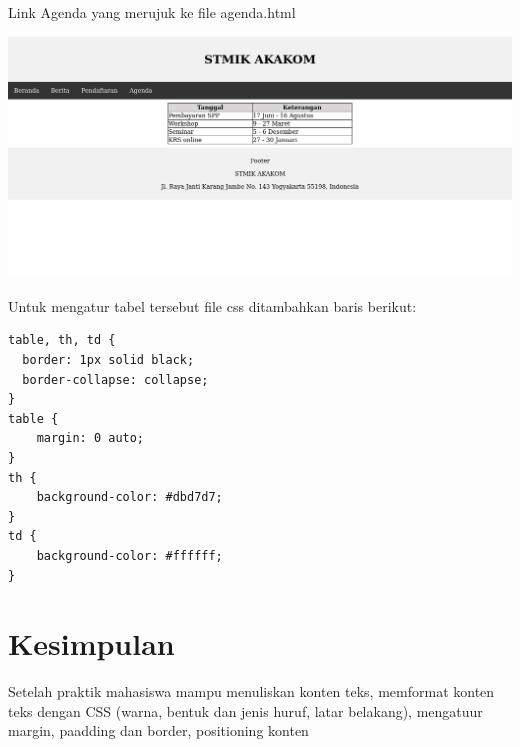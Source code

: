 \documentclass[a4paper,12pt]{article}
\begin{document}
Link Agenda yang merujuk ke file agenda.html
\begin{center}
    \includegraphics[width=\linewidth]{9.png}
\end{center}
Untuk mengatur tabel tersebut file css ditambahkan baris berikut:
\begin{lstlisting}
table, th, td {
  border: 1px solid black;
  border-collapse: collapse;
}
table {
    margin: 0 auto;
}
th {
    background-color: #dbd7d7;
}
td {
    background-color: #ffffff;
}
\end{lstlisting}


\newpage
\section{Kesimpulan}
Setelah praktik mahasiswa mampu menuliskan konten teks, memformat konten teks dengan CSS (warna, bentuk dan jenis huruf, latar belakang),
mengatuur margin, paadding dan border, positioning konten
\end{document}

